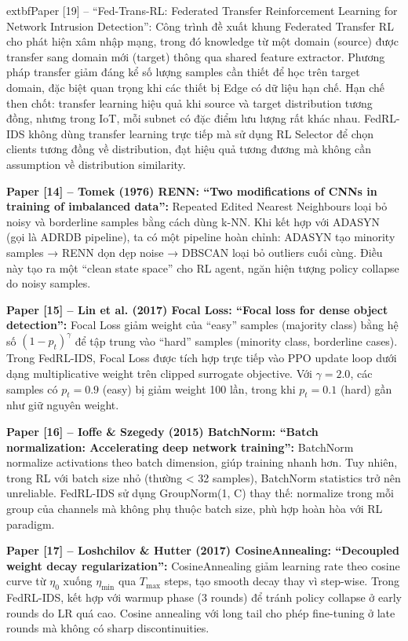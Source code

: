 \documentclass[12pt,a4paper]{article}
\begin{document}
	extbf{Paper [19] -- ``Fed-Trans-RL: Federated Transfer Reinforcement Learning for Network Intrusion Detection'': } Công trình đề xuất khung Federated Transfer RL cho phát hiện xâm nhập mạng, trong đó knowledge từ một domain (source) được transfer sang domain mới (target) thông qua shared feature extractor. Phương pháp transfer giảm đáng kể số lượng samples cần thiết để học trên target domain, đặc biệt quan trọng khi các thiết bị Edge có dữ liệu hạn chế. Hạn chế then chốt: transfer learning hiệu quả khi source và target distribution tương đồng, nhưng trong IoT, mỗi subnet có đặc điểm lưu lượng rất khác nhau. FedRL-IDS không dùng transfer learning trực tiếp mà sử dụng RL Selector để chọn clients tương đồng về distribution, đạt hiệu quả tương đương mà không cần assumption về distribution similarity.

\textbf{Paper [14] -- Tomek (1976) RENN: ``Two modifications of CNNs in training of imbalanced data'': } Repeated Edited Nearest Neighbours loại bỏ noisy và borderline samples bằng cách dùng k-NN. Khi kết hợp với ADASYN (gọi là ADRDB pipeline), ta có một pipeline hoàn chỉnh: ADASYN tạo minority samples → RENN dọn dẹp noise → DBSCAN loại bỏ outliers cuối cùng. Điều này tạo ra một ``clean state space'' cho RL agent, ngăn hiện tượng policy collapse do noisy samples.

\textbf{Paper [15] -- Lin et al. (2017) Focal Loss: ``Focal loss for dense object detection'': } Focal Loss giảm weight của ``easy'' samples (majority class) bằng hệ số $(1-p_t)^\gamma$ để tập trung vào ``hard'' samples (minority class, borderline cases). Trong FedRL-IDS, Focal Loss được tích hợp trực tiếp vào PPO update loop dưới dạng multiplicative weight trên clipped surrogate objective. Với $\gamma=2.0$, các samples có $p_t=0.9$ (easy) bị giảm weight 100 lần, trong khi $p_t=0.1$ (hard) gần như giữ nguyên weight.

\textbf{Paper [16] -- Ioffe \& Szegedy (2015) BatchNorm: ``Batch normalization: Accelerating deep network training'': } BatchNorm normalize activations theo batch dimension, giúp training nhanh hơn. Tuy nhiên, trong RL với batch size nhỏ (thường < 32 samples), BatchNorm statistics trở nên unreliable. FedRL-IDS sử dụng GroupNorm(1, C) thay thế: normalize trong mỗi group của channels mà không phụ thuộc batch size, phù hợp hoàn hòa với RL paradigm.

\textbf{Paper [17] -- Loshchilov \& Hutter (2017) CosineAnnealing: ``Decoupled weight decay regularization'': } CosineAnnealing giảm learning rate theo cosine curve từ $\eta_0$ xuống $\eta_{\min}$ qua $T_{\max}$ steps, tạo smooth decay thay vì step-wise. Trong FedRL-IDS, kết hợp với warmup phase (3 rounds) để tránh policy collapse ở early rounds do LR quá cao. Cosine annealing với long tail cho phép fine-tuning ở late rounds mà không có sharp discontinuities.
\end{document}
